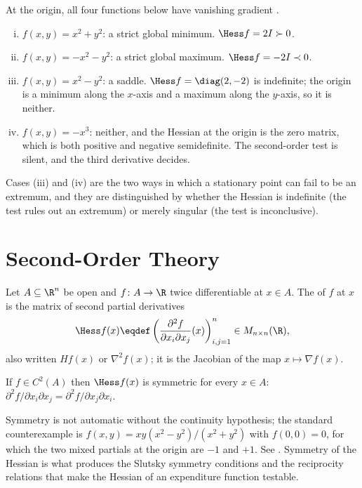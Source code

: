\begin{eg}\label{eg:four-surfaces}
	At the origin, all four functions below have vanishing gradient
	\autocite[slide 53]{fukuda2026calculus}.
	\begin{enumerate}[(i)]
		\item $f(x,y)=x^2+y^2$: a strict global minimum. $\Hess f=2I\succ0$.
		\item $f(x,y)=-x^2-y^2$: a strict global maximum. $\Hess f=-2I\prec0$.
		\item $f(x,y)=x^2-y^2$: a saddle. $\Hess f=\diag(2,-2)$ is indefinite;
		      the origin is a minimum along the $x$-axis and a maximum along the
		      $y$-axis, so it is neither.
		\item $f(x,y)=-x^3$: neither, and the Hessian at the origin is the zero
		      matrix, which is both positive and negative semidefinite. The second-order
		      test is silent, and the third derivative decides.
	\end{enumerate}
	Cases (iii) and (iv) are the two ways in which a stationary point can fail to be
	an extremum, and they are distinguished by whether the Hessian is indefinite
	(the test rules out an extremum) or merely singular (the test is
	inconclusive).
\end{eg}

\section{Second-Order Theory}\label{sec:cn-second}

\begin{definition}[Hessian]\label{def:hessian}
	Let $A\subseteq\R^n$ be open and $f\colon A\to\R$ twice differentiable at
	$x\in A$. The  of $f$ at $x$ is the matrix of second partial
	derivatives
	\[
		\Hess f(x)\eqdef
		\left(\frac{\partial^2f}{\partial x_i\partial x_j}(x)\right)_{i,j=1}^{n}
		\in M_{n\times n}(\R),
	\]
	also written $Hf(x)$ or $\nabla^2f(x)$; it is the Jacobian of the map
	$x\mapsto\nabla f(x)$.
\end{definition}

\begin{theorem}[Schwarz]\label{thm:schwarz}
	If $f\in C^2(A)$ then $\Hess f(x)$ is symmetric for every $x\in A$:
	$\partial^2f/\partial x_i\partial x_j=\partial^2f/\partial x_j\partial x_i$.
\end{theorem}

Symmetry is not automatic without the continuity hypothesis; the standard
counterexample is $f(x,y)=xy(x^2-y^2)/(x^2+y^2)$ with $f(0,0)=0$, for which the
two mixed partials at the origin are $-1$ and $+1$. See
\textcite[Thm.~9.41]{rudin1976principles}. Symmetry of the Hessian is what
produces the Slutsky symmetry conditions and the reciprocity relations that make
the Hessian of an expenditure function testable.

